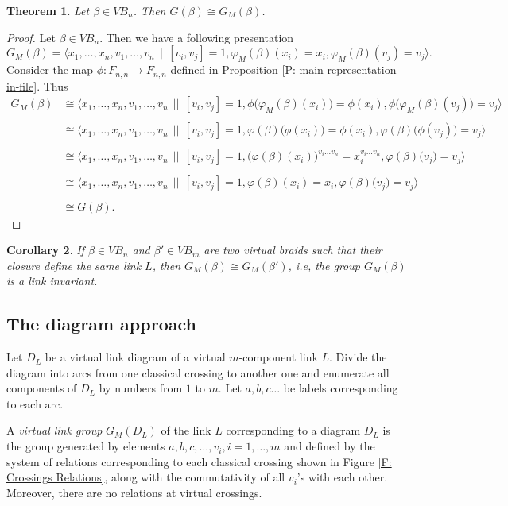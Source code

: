 \documentclass[11 pt, reqno]{amsart}
\newtheorem{theorem}{Theorem}[section]
\newtheorem{corollary}[theorem]{Corollary}
\theoremstyle{definition}
\numberwithin{equation}{subsection}
\begin{document}
\begin{theorem}\label{isomorphism-of-G-and-G_M}
Let $\beta \in VB_n$. Then $G(\beta) \cong G_M(\beta)$.
\end{theorem}
\begin{proof}
Let $\beta \in VB_n$. Then we have a following presentation
$$
G_M(\beta)=\langle x_1, \ldots, x_n, v_1, \ldots, v_n~~|~~[v_i, v_j]=1, \varphi_M(\beta)(x_i)=x_i, \varphi_M(\beta)(v_j)=v_j \rangle.
$$
Consider the map $\phi: F_{n,n} \to F_{n,n}$ defined in Proposition \ref{P: main-representation-in-file}.
Thus 
\begin{align*}
G_M(\beta) &\cong \langle x_1, \ldots, x_n, v_1, \ldots, v_n~~||~~[v_i, v_j]=1, \phi \big(\varphi_M(\beta)(x_i)\big)=\phi(x_i), \phi\big(\varphi_M(\beta)(v_j)\big)=v_j \rangle\\
\\
&\cong \langle x_1, \ldots, x_n, v_1, \ldots, v_n~~||~~[v_i, v_j]=1, \varphi(\beta)\big(\phi(x_i)\big)=\phi(x_i), \varphi(\beta)\big(\phi(v_j)\big)=v_j \rangle\\
\\
&\cong \langle x_1, \ldots, x_n, v_1, \ldots, v_n~~||~~[v_i, v_j]=1, \big(\varphi(\beta)(x_i)\big)^{v_i\ldots v_n}=x_i^{v_i \ldots v_n}, \varphi(\beta)\big(v_j\big)=v_j \rangle\\
\\
&\cong \langle x_1, \ldots, x_n, v_1, \ldots, v_n~~||~~[v_i, v_j]=1, \varphi(\beta)(x_i)=x_i, \varphi(\beta)\big(v_j\big)=v_j \rangle\\
\\
&\cong G(\beta).
\end{align*}




\end{proof}

\begin{corollary}
If $\beta \in VB_n$ and $\beta' \in VB_m$ are two virtual braids such that their closure define the same link $L$, then $G_M(\beta) \cong G_M(\beta')$, i.e, the group $G_M(\beta)$ is a link invariant.
\end{corollary}

\subsection{The diagram approach}\label{diagram-approach}
Let $D_L$ be a virtual link diagram of a virtual $m$-component link $L$. Divide the diagram into arcs from one classical crossing to another one and enumerate all components of $D_L$ by numbers from $1$ to $m$. Let $a,b,c \ldots$ be labels corresponding to each arc. 
\par
A {\it virtual link group} $G_M(D_L)$ of the link $L$ corresponding to a diagram $D_L$ is the group generated by elements $a, b, c ,\ldots, v_i, i=1,\ldots,m$ and defined by the system of relations corresponding to each classical crossing shown in Figure \ref{F: Crossings Relations}, along with the commutativity of all $v_i$'s with each other. Moreover, there are no relations at virtual crossings.
\end{document}
